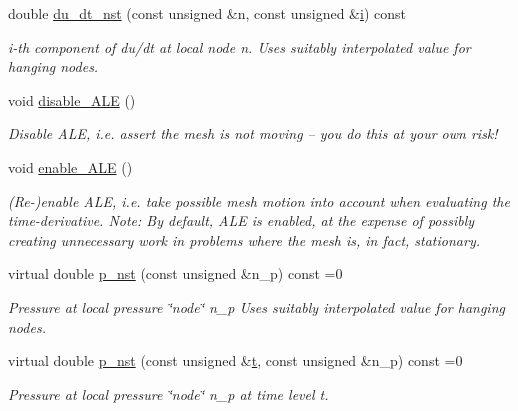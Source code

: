 \begin{DoxyCompactItemize}
double \hyperlink{classoomph_1_1GeneralisedNewtonianNavierStokesEquations_a4633e47af05cc10a1125d711eeef1378}{du\+\_\+dt\+\_\+nst} (const unsigned \&n, const unsigned \&\hyperlink{cfortran_8h_adb50e893b86b3e55e751a42eab3cba82}{i}) const
\begin{DoxyCompactList}\small\item\em i-\/th component of du/dt at local node n. Uses suitably interpolated value for hanging nodes. \end{DoxyCompactList}\item 
void \hyperlink{classoomph_1_1GeneralisedNewtonianNavierStokesEquations_af77bfb806b670ec6649f56e82169160f}{disable\+\_\+\+A\+LE} ()
\begin{DoxyCompactList}\small\item\em Disable A\+LE, i.\+e. assert the mesh is not moving -- you do this at your own risk! \end{DoxyCompactList}\item 
void \hyperlink{classoomph_1_1GeneralisedNewtonianNavierStokesEquations_a2eeb40971bc2f1018c9c75289807e737}{enable\+\_\+\+A\+LE} ()
\begin{DoxyCompactList}\small\item\em (Re-\/)enable A\+LE, i.\+e. take possible mesh motion into account when evaluating the time-\/derivative. Note\+: By default, A\+LE is enabled, at the expense of possibly creating unnecessary work in problems where the mesh is, in fact, stationary. \end{DoxyCompactList}\item 
virtual double \hyperlink{classoomph_1_1GeneralisedNewtonianNavierStokesEquations_ae56b835810547b77405585b3a4091eec}{p\+\_\+nst} (const unsigned \&n\+\_\+p) const =0
\begin{DoxyCompactList}\small\item\em Pressure at local pressure \char`\"{}node\char`\"{} n\+\_\+p Uses suitably interpolated value for hanging nodes. \end{DoxyCompactList}\item 
virtual double \hyperlink{classoomph_1_1GeneralisedNewtonianNavierStokesEquations_a82eebde146ffb1b65a6c1ed8583c87f6}{p\+\_\+nst} (const unsigned \&\hyperlink{cfortran_8h_af6f0bd3dc13317f895c91323c25c2b8f}{t}, const unsigned \&n\+\_\+p) const =0
\begin{DoxyCompactList}\small\item\em Pressure at local pressure \char`\"{}node\char`\"{} n\+\_\+p at time level t. \end{DoxyCompactList}\item 

\end{DoxyCompactItemize}
